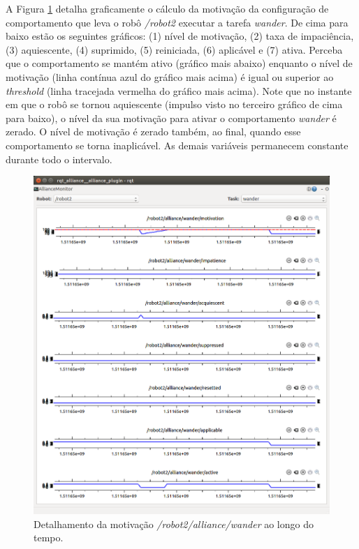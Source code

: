             A Figura \ref{fig:rqt_alliance_detailed_motivation} detalha graficamente o cálculo da motivação da configuração de comportamento que leva o robô \textit{/robot2} executar a tarefa \textit{wander}. De cima para baixo estão os seguintes gráficos: (1) nível de motivação, (2) taxa de impaciência, (3) aquiescente, (4) suprimido, (5) reiniciada, (6) aplicável e (7) ativa. Perceba que o comportamento se mantém ativo (gráfico mais abaixo) enquanto o nível de motivação (linha contínua azul do gráfico mais acima) é igual ou superior ao \textit{threshold} (linha tracejada vermelha do gráfico mais acima). Note que no instante em que o robô se tornou aquiescente (impulso visto no terceiro gráfico de cima para baixo), o nível da sua motivação para ativar o comportamento \textit{wander} é zerado. O nível de motivação é zerado também, ao final, quando esse comportamento se torna inaplicável. As demais variáveis permanecem constante durante todo o intervalo.
            
            \begin{figure}
                \centering
                \includegraphics[width=\textwidth]{Figuras/4_resultados/rqt_alliance6.png}
                \caption{Detalhamento da motivação \textit{/robot2/alliance/wander} ao longo do tempo.}
                \label{fig:rqt_alliance_detailed_motivation}
            \end{figure}
            
